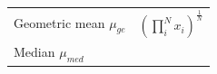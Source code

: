 \documentclass[
]{book}
\begin{document}
\begin{longtable}[]{@{}
  >{\raggedright\arraybackslash}p{}
  >{\raggedright\arraybackslash}p{}@{}}
Geometric mean \(\mu_{ge}\) & \(                                                                                                                                                                                                                                                                                                                                                                                                                                                                                                                                                      
                                                                                                                                                                                                                                                                                                                                                                                                                               (\prod_i^N x_i)^{\frac{1}{N}}                                                                                                                          
                                                                                                                                                                                                                                                                                                                                                                                                                               \) \\
Median \(\mu_{med}\) & \(                                                                                                                                                                                                                                                                                                                                                                                                                                                                                                                                                      
                                                                                                                                                                                                                                                                                                                                                                                                                               \begin{aligned}                                                                                                                                        

\end{aligned}
\end{longtable}
\end{document}
